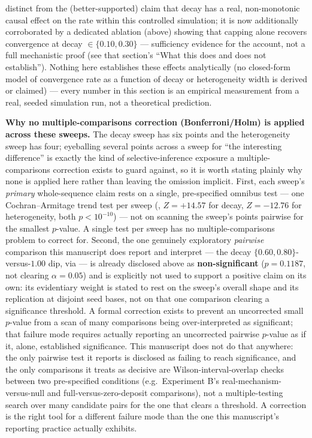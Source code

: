 \documentclass[
  english,
]{article}
\newcounter{none} %
\theoremstyle{definition}
\begin{document}
distinct from the (better-supported) claim that decay has a real,
non-monotonic causal effect on the rate within this controlled
simulation; it is now additionally corroborated by a dedicated
 ablation (above) showing that
capping alone recovers convergence at decay \(\in \{0.10, 0.30\}\) ---
sufficiency evidence for the account, not a full mechanistic proof (see
that section's ``What this does and does not establish''). Nothing here
establishes these effects analytically (no closed-form model of
convergence rate as a function of decay or heterogeneity width is
derived or claimed) --- every number in this section is an empirical
measurement from a real, seeded simulation run, not a theoretical
prediction.

\textbf{Why no multiple-comparisons correction (Bonferroni/Holm) is
applied across these sweeps.} The decay sweep has six points and the
heterogeneity sweep has four; eyeballing several points across a sweep
for ``the interesting difference'' is exactly the kind of
selective-inference exposure a multiple-comparisons correction exists to
guard against, so it is worth stating plainly why none is applied here
rather than leaving the omission implicit. First, each sweep's
\emph{primary} whole-sequence claim rests on a single, pre-specified
omnibus test --- one Cochran--Armitage trend test per sweep
(, \(Z=+14.57\) for decay,
\(Z=-12.76\) for heterogeneity, both \(p<10^{-10}\)) --- not on scanning
the sweep's points pairwise for the smallest \(p\)-value. A single test
per sweep has no multiple-comparisons problem to correct for. Second,
the one genuinely exploratory \emph{pairwise} comparison this manuscript
does report and interpret --- the decay
\(\{0.60,0.80\}\)-versus-\(1.00\) dip, via
 --- is already disclosed above
as \textbf{non-significant} (\(p=0.1187\), not clearing \(\alpha=0.05\))
and is explicitly not used to support a positive claim on its own: its
evidentiary weight is stated to rest on the sweep's overall shape and
its replication at disjoint seed bases, not on that one comparison
clearing a significance threshold. A formal correction exists to prevent
an uncorrected small \(p\)-value from a scan of many comparisons being
over-interpreted as significant; that failure mode requires actually
reporting an uncorrected pairwise \(p\)-value as if it, alone,
established significance. This manuscript does not do that anywhere: the
only pairwise test it reports is disclosed as failing to reach
significance, and the only comparisons it treats as decisive are
Wilson-interval-overlap checks between two pre-specified conditions
(e.g.~Experiment B's real-mechanism- versus-null and
full-versus-zero-deposit comparisons), not a multiple-testing search
over many candidate pairs for the one that clears a threshold. A
correction is the right tool for a different failure mode than the one
this manuscript's reporting practice actually exhibits.
\end{document}
